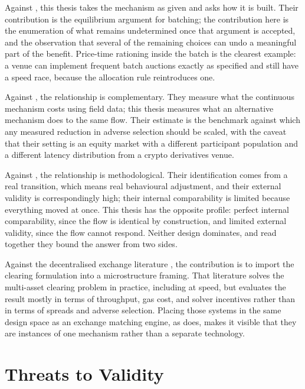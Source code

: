 Against \citet{budish2015hft}, this thesis takes the mechanism as given
and asks how it is built. Their contribution is the equilibrium argument
for batching; the contribution here is the enumeration of what remains
undetermined once that argument is accepted, and the observation that
several of the remaining choices can undo a meaningful part of the
benefit. Price-time rationing inside the batch is the clearest example:
a venue can implement frequent batch auctions exactly as specified and
still have a speed race, because the allocation rule reintroduces one.

Against \citet{aquilina2022quantifying}, the relationship is
complementary. They measure what the continuous mechanism costs using
field data; this thesis measures what an alternative mechanism does to
the same flow. Their estimate is the benchmark against which any
measured reduction in adverse selection should be scaled, with the
caveat that their setting is an equity market with a different
participant population and a different latency distribution from a
crypto derivatives venue.

Against \citet{lee2026taiwan}, the relationship is methodological. Their
identification comes from a real transition, which means real behavioural
adjustment, and their external validity is correspondingly high; their
internal comparability is limited because everything moved at once. This
thesis has the opposite profile: perfect internal comparability, since
the flow is identical by construction, and limited external validity,
since the flow cannot respond. Neither design dominates, and read
together they bound the answer from two sides.

Against the decentralised exchange literature
\citep{walther2021multitoken,ramsay2023speedex,dutta2025cow}, the
contribution is to import the clearing formulation into a microstructure
framing. That literature solves the multi-asset clearing problem in
practice, including at speed, but evaluates the result mostly in terms
of throughput, gas cost, and solver incentives rather than in terms of
spreads and adverse selection. Placing those systems in the same design
space as an exchange matching engine, as  does,
makes it visible that they are instances of one mechanism rather than a
separate technology.

\section{Threats to Validity}
\label{sec:validity}

